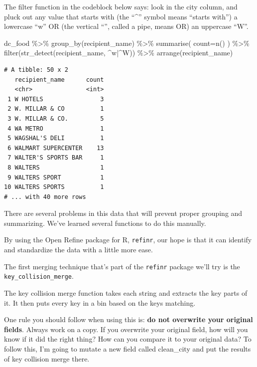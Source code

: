 \documentclass[
  letterpaper,
  DIV=11,
  numbers=noendperiod]{scrreprt}
\newenvironment{Shaded}{\begin{snugshade}}{\end{snugshade}}
\newcommand{\AttributeTok}[1]{\textcolor[rgb]{0.40,0.45,0.13}{#1}}
\newcommand{\FunctionTok}[1]{\textcolor[rgb]{0.28,0.35,0.67}{#1}}
\newcommand{\NormalTok}[1]{\textcolor[rgb]{0.00,0.23,0.31}{#1}}
\newcommand{\SpecialCharTok}[1]{\textcolor[rgb]{0.37,0.37,0.37}{#1}}
\newcommand{\StringTok}[1]{\textcolor[rgb]{0.13,0.47,0.30}{#1}}
\begin{document}
The filter function in the codeblock below says: look in the city
column, and pluck out any value that starts with (the ``\^{}'' symbol
means ``starts with'') a lowercase ``w'' OR (the vertical
``\textbar{}'', called a pipe, means OR) an uppercase ``W''.

\begin{Shaded}
\begin{Highlighting}[]
\NormalTok{dc\_food }\SpecialCharTok{\%\textgreater{}\%}
  \FunctionTok{group\_by}\NormalTok{(recipient\_name) }\SpecialCharTok{\%\textgreater{}\%}
  \FunctionTok{summarise}\NormalTok{(}
    \AttributeTok{count=}\FunctionTok{n}\NormalTok{()}
\NormalTok{  ) }\SpecialCharTok{\%\textgreater{}\%}
  \FunctionTok{filter}\NormalTok{(}\FunctionTok{str\_detect}\NormalTok{(recipient\_name, }\StringTok{\textquotesingle{}\^{}w|\^{}W\textquotesingle{}}\NormalTok{)) }\SpecialCharTok{\%\textgreater{}\%}
  \FunctionTok{arrange}\NormalTok{(recipient\_name)}
\end{Highlighting}
\end{Shaded}

\begin{verbatim}
# A tibble: 50 x 2
   recipient_name      count
   <chr>               <int>
 1 W HOTELS                3
 2 W. MILLAR & CO          1
 3 W. MILLAR & CO.         5
 4 WA METRO                1
 5 WAGSHAL'S DELI          1
 6 WALMART SUPERCENTER    13
 7 WALTER'S SPORTS BAR     1
 8 WALTERS                 1
 9 WALTERS SPORT           1
10 WALTERS SPORTS          1
# ... with 40 more rows
\end{verbatim}

There are several problems in this data that will prevent proper
grouping and summarizing. We've learned several functions to do this
manually.

By using the Open Refine package for R, \texttt{refinr}, our hope is
that it can identify and standardize the data with a little more ease.

The first merging technique that's part of the \texttt{refinr} package
we'll try is the \texttt{key\_collision\_merge}.

The key collision merge function takes each string and extracts the key
parts of it. It then puts every key in a bin based on the keys matching.

One rule you should follow when using this is: \textbf{do not overwrite
your original fields}. Always work on a copy. If you overwrite your
original field, how will you know if it did the right thing? How can you
compare it to your original data? To follow this, I'm going to mutate a
new field called clean\_city and put the results of key collision merge
there.
\end{document}
